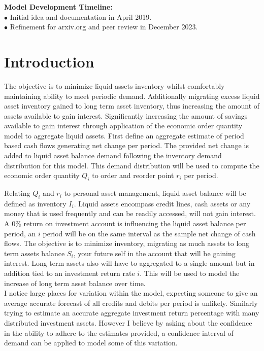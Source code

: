 \documentclass{article}
\begin{document}
\textbf{Model Development Timeline:}\\
$\bullet$ \; Initial idea and documentation in April 2019.\\
$\bullet$ \; Refinement for arxiv.org and peer review in December 2023. \\

\section{Introduction}

The objective is to minimize liquid assets inventory whilst comfortably maintaining ability to meet periodic demand. Additionally migrating excess liquid asset inventory gained to long term asset inventory, thus increasing the amount of assets available to gain interest. Significantly increasing  the amount of savings available to gain interest through application of the economic order quantity model to aggregate liquid assets. First define an aggregate estimate of period based cash flows generating net change per period. The provided net change is added to liquid asset balance demand following the inventory demand distribution for this model. This demand distribution will be used to compute the economic order quantity $Q_{i}$ to order and reorder point $r_{i}$ per period. 

Relating $Q_{i}$ and $r_{i}$ to personal asset management, liquid asset balance will be defined as inventory $I_{i}$. Liquid assets encompass credit lines, cash assets or any money that is used frequently and can be readily accessed, will not gain interest.  A 0\% return on investment account is influencing the liquid asset balance per period, an $i$ period will be on the same interval as the sample net change of cash flows. The objective is to minimize inventory, migrating as much assets to long term assets balance $S_{i}$, your future self in the account that will be gaining interest. Long term assets also will have to aggregated to a single amount but in addition tied to an investment return rate $i$. This will be used to model the increase of  long term asset balance over time.\\

I notice large places for variation within the model, expecting someone to give an average accurate forecast of all credits and debits per period is unlikely. Similarly trying to estimate an accurate aggregate investment return percentage with many distributed investment assets. However I believe by asking about the confidence in the ability to adhere to the estimates provided, a confidence interval of demand can be applied to model some of this variation.  
\end{document}
